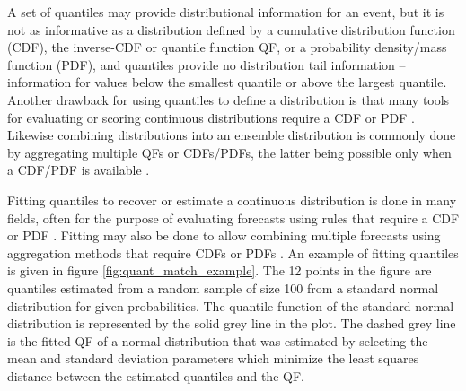 A set of quantiles may provide distributional information for an event, but it 
is not as informative as a distribution defined by a cumulative distribution 
function (CDF), the inverse-CDF or quantile function QF, or a probability 
density/mass function (PDF), and quantiles provide no distribution tail 
information --information for values below the smallest quantile or above the 
largest quantile. Another drawback for using quantiles to define a distribution 
is that many tools for evaluating or scoring continuous distributions require 
a CDF or PDF
\cite[]{gneiting2007strictly,gneiting2014probabilistic}. Likewise combining 
distributions into an ensemble distribution is commonly 
done by aggregating multiple QFs or 
CDFs/PDFs, the latter being possible only when a CDF/PDF is available 
\cite[]{gneiting2005calibrated,wang2023forecast}.

Fitting quantiles to recover or estimate a continuous distribution is done in 
many fields, often for the purpose of evaluating forecasts using rules that 
require a CDF or PDF \cite[]{simpson2023interpolating, gerding2023evaluating}. 
Fitting may also be done to allow combining multiple forecasts using aggregation 
methods that require CDFs or PDFs 
\cite[]{gyamerah2020probabilistic,li2019combining,baran2018combining,
bogner2017combining,he2016short,gneiting2005calibrated}. 
An example of fitting quantiles is given in figure 
\ref{fig:quant_match_example}. The 12 points in the figure are quantiles 
estimated from a random sample of size 100 from a standard normal distribution 
for given probabilities. The quantile function of the standard normal 
distribution is represented by the solid grey line in the plot. 
The dashed grey line is the fitted QF of a normal 
distribution that was estimated by selecting the mean and standard deviation 
parameters which minimize the least squares distance between the estimated 
quantiles and the QF.

